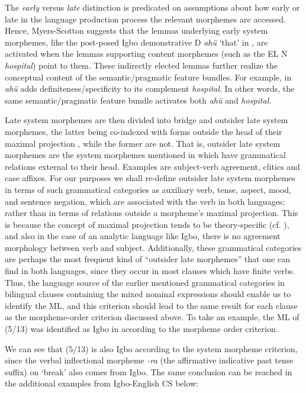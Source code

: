 \documentclass[output=paper]{langsci/langscibook}
\begin{document}
The \textit{early} versus \textit{late} distinction is predicated on assumptions about how early or late in the language production process the relevant morphemes are accessed. Hence, Myers-Scotton suggests that the lemmas underlying early system morphemes, like the post-posed Igbo demonstrative D \textit{ahü} ‘that’ in , are activated when the lemmas supporting content morphemes (such as the EL N \textit{hospital}) point to them. These indirectly elected lemmas further realize the conceptual content of the semantic/pragmatic feature bundles. For example, in  \textit{ahü} adds definiteness/specificity to its complement \textit{hospital}. In other words, the same semantic/pragmatic feature bundle activates both \textit{ahü} and \textit{hospital.} 

Late system morphemes are then divided into bridge and outsider late system morphemes, the latter being co-indexed with forms outside the head of their maximal projection \citep[75]{MyersScotton2002}, while the former are not. That is, outsider late system morphemes are the system morphemes mentioned in  which have grammatical relations external to their head. Examples are subject-verb agreement, clitics and case affixes. For our purposes we shall re-define outsider late system morphemes in terms of such grammatical categories as auxiliary verb, tense, aspect, mood, and sentence negation, which are associated with the verb in both languages; rather than in terms of relations outside a morpheme’s maximal projection. This is because the concept of maximal projection tends to be theory-specific (cf. \citealt{Fukui2001}), and also in the case of an analytic language like Igbo, there is no agreement morphology between verb and subject. Additionally, these grammatical categories are perhaps the most frequent kind of “outsider late morphemes” that one can find in both languages, since they occur in most clauses which have finite verbs. Thus, the language source of the earlier mentioned grammatical categories in bilingual clauses containing the mixed nominal expressions should enable us to identify the ML, and this criterion should lead to the same result for each clause as the morpheme-order criterion discussed above. To take an example, the ML of (5/13) was identified as Igbo in  according to the morpheme order criterion.

We can see that (5/13) is also Igbo according to the system morpheme criterion, since the verbal inflectional morpheme \textit{-ra} (the affirmative indicative past tense suffix) on ‘break’ also comes from Igbo. The same conclusion can be reached in the additional examples from Igbo-English CS below: 
\end{document}

